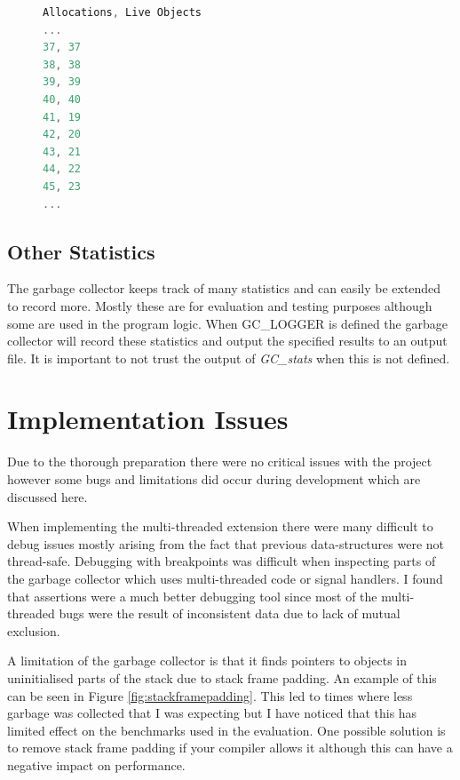 \documentclass[../diss.tex]{subfiles}
\begin{document}
\begin{figure}
\begin{lstlisting}[language=C, caption=An example logger output, label={lst:logger_res}]
Allocations, Live Objects
...
37, 37
38, 38
39, 39
40, 40
41, 19
42, 20
43, 21
44, 22
45, 23
...
\end{lstlisting}
\end{figure}

\subsection{Other Statistics}

The garbage collector keeps track of many statistics and can easily be extended to record more. Mostly these are for evaluation and testing purposes although some are used in the program logic. When GC\_LOGGER is defined the garbage collector will record these statistics and output the specified results to an output file. It is important to not trust the output of \emph{GC\_stats} when this is not defined.

\section{Implementation Issues} \label{sec:implementationissues}

Due to the thorough preparation there were no critical issues with the project however some bugs and limitations did occur during development which are discussed here.

When implementing the multi-threaded extension there were many difficult to debug issues mostly arising from the fact that previous data-structures were not thread-safe. Debugging with breakpoints was difficult when inspecting parts of the garbage collector which uses multi-threaded code or signal handlers. I found that assertions were a much better debugging tool since most of the multi-threaded bugs were the result of inconsistent data due to lack of mutual exclusion.

A limitation of the garbage collector is that it finds pointers to objects in uninitialised parts of the stack due to stack frame padding. An example of this can be seen in Figure \ref{fig:stackframepadding}. This led to times where less garbage was collected that I was expecting but I have noticed that this has limited effect on the benchmarks used in the evaluation. One possible solution is to remove stack frame padding if your compiler allows it although this can have a negative impact on performance.
\end{document}
